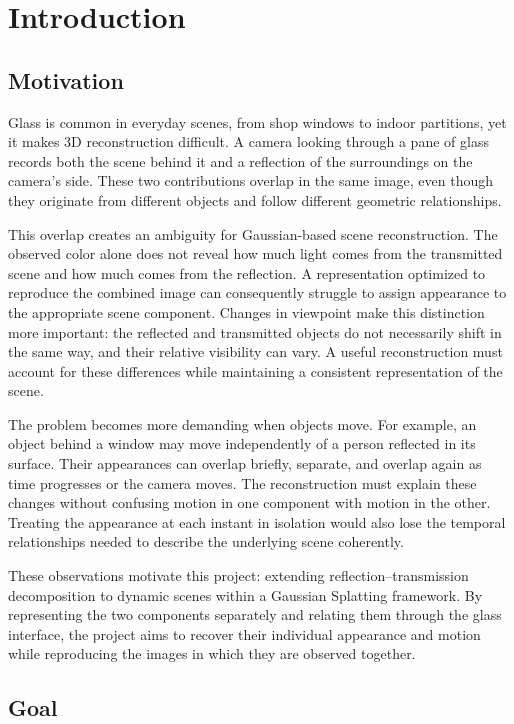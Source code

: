 \chapter{Introduction}
\section{Motivation}

Glass is common in everyday scenes, from shop windows to indoor partitions, yet it makes 3D reconstruction difficult. A camera looking through a pane of glass records both the scene behind it and a reflection of the surroundings on the camera's side. These two contributions overlap in the same image, even though they originate from different objects and follow different geometric relationships.

This overlap creates an ambiguity for Gaussian-based scene reconstruction. The observed color alone does not reveal how much light comes from the transmitted scene and how much comes from the reflection. A representation optimized to reproduce the combined image can consequently struggle to assign appearance to the appropriate scene component. Changes in viewpoint make this distinction more important: the reflected and transmitted objects do not necessarily shift in the same way, and their relative visibility can vary. A useful reconstruction must account for these differences while maintaining a consistent representation of the scene.

The problem becomes more demanding when objects move. For example, an object behind a window may move independently of a person reflected in its surface. Their appearances can overlap briefly, separate, and overlap again as time progresses or the camera moves. The reconstruction must explain these changes without confusing motion in one component with motion in the other. Treating the appearance at each instant in isolation would also lose the temporal relationships needed to describe the underlying scene coherently.

These observations motivate this project: extending reflection--transmission decomposition to dynamic scenes within a Gaussian Splatting framework. By representing the two components separately and relating them through the glass interface, the project aims to recover their individual appearance and motion while reproducing the images in which they are observed together.

\section{Goal}

